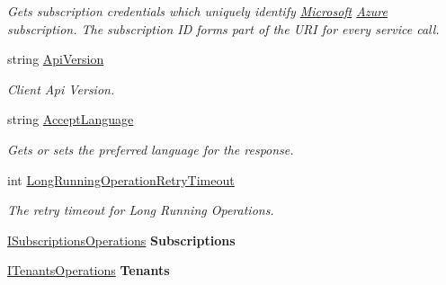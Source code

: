 \begin{DoxyCompactItemize}
\begin{DoxyCompactList}\small\item\em Gets subscription credentials which uniquely identify \hyperlink{namespace_microsoft}{Microsoft} \hyperlink{namespace_microsoft_1_1_azure}{Azure} subscription. The subscription ID forms part of the U\+RI for every service call. \end{DoxyCompactList}\item 
string \hyperlink{interface_microsoft_1_1_azure_1_1_management_1_1_resources_1_1_i_subscription_client_a5145743b1565db5907a4f553cea767d8}{Api\+Version}
\begin{DoxyCompactList}\small\item\em Client Api Version. \end{DoxyCompactList}\item 
string \hyperlink{interface_microsoft_1_1_azure_1_1_management_1_1_resources_1_1_i_subscription_client_a30bf8817047a3b3a860004dd1bfd611f}{Accept\+Language}
\begin{DoxyCompactList}\small\item\em Gets or sets the preferred language for the response. \end{DoxyCompactList}\item 
int \hyperlink{interface_microsoft_1_1_azure_1_1_management_1_1_resources_1_1_i_subscription_client_a8e15418fd4134bc377566d9215151a4a}{Long\+Running\+Operation\+Retry\+Timeout}
\begin{DoxyCompactList}\small\item\em The retry timeout for Long Running Operations. \end{DoxyCompactList}\item 
\hyperlink{interface_microsoft_1_1_azure_1_1_management_1_1_resources_1_1_i_subscriptions_operations}{I\+Subscriptions\+Operations} {\bfseries Subscriptions}\hypertarget{interface_microsoft_1_1_azure_1_1_management_1_1_resources_1_1_i_subscription_client_a0bc138534690e37ca9390b56916098d0}{}\label{interface_microsoft_1_1_azure_1_1_management_1_1_resources_1_1_i_subscription_client_a0bc138534690e37ca9390b56916098d0}

\item 
\hyperlink{interface_microsoft_1_1_azure_1_1_management_1_1_resources_1_1_i_tenants_operations}{I\+Tenants\+Operations} {\bfseries Tenants}\hypertarget{interface_microsoft_1_1_azure_1_1_management_1_1_resources_1_1_i_subscription_client_a73ffb246548d9f167b1f04e5039d7237}{}\label{interface_microsoft_1_1_azure_1_1_management_1_1_resources_1_1_i_subscription_client_a73ffb246548d9f167b1f04e5039d7237}

\end{DoxyCompactItemize}


